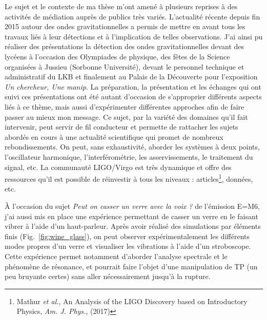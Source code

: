 \documentclass[12pt,a4paper]{article}
\begin{document}
Le sujet et le contexte de ma thèse m'ont amené à plusieurs reprises à des activités de médiation auprès de publics très variés.
L'actualité récente depuis fin 2015 autour des ondes gravitationnelles a permis de mettre en avant tous les travaux liés à leur détections et à l'implication de telles observations.
J'ai ainsi pu réaliser des présentations la détection des ondes gravitationnelles devant des lycéens à l'occasion des Olympiades de physique, des fêtes de la Science organisées à Jussieu (Sorbonne Université), devant le personnel technique et administratif du LKB et finalement au Palais de la Découverte pour l'exposition \textit{Un chercheur, Une manip}.
La préparation, la présentation et les échanges qui ont suivi ces présentations ont été autant d'occasion de s'approprier différents aspects liés à ce thème, mais aussi d'expérimenter différentes approches afin de faire passer au mieux mon message.
Ce sujet, par la variété des domaines qu'il fait intervenir, peut servir de fil conducteur et permette de rattacher les sujets abordés en cours à une actualité scientifique qui promet de nombreux rebondissements.
On peut, sans exhaustivité, aborder les systèmes à deux points, l'oscillateur harmonique, l'interférométrie, les asservissements, le traitement du signal, etc.
La communauté LIGO/Virgo est très dynamique et offre des ressources qu'il est possible de réinvestir à tous les niveaux : articles\footnote{Mathur \textit{et al.}, An Analysis of the LIGO Discovery based on Introductory Physics, \textit{Am. J. Phys.}, (2017)}, données, etc.

À l'occasion du sujet \textit{Peut on casser un verre avec la voix ?} de l'émission E=M6, j'ai aussi mis en place une expérience permettant de casser un verre en le faisant vibrer à l'aide d'un haut-parleur.
Après avoir réalisé des simulations par éléments finis (Fig.~\ref{fig:wine_glass}), on peut observer expérimentalement les différents modes propres d'un verre et visualiser les vibrations à l'aide d'un stroboscope.
Cette expérience permet notamment d'aborder l'analyse spectrale et le phénomène de résonance, et pourrait faire l'objet d'une manipulation de TP (un peu bruyante certes) sans aller nécessairement jusqu'à la rupture.
\end{document}
